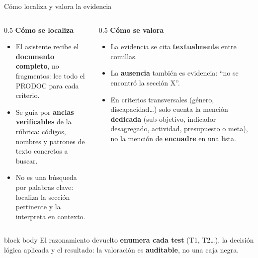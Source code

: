 \documentclass[aspectratio=169,11pt]{beamer}
\newcommand{\redlead}[1]{\textbf{\color{iloRed}#1}}
\newcommand{\bluelead}[1]{\textbf{\color{iloBlue}#1}}
\begin{document}
\begin{frame}{Cómo localiza y valora la evidencia}
  \small
  \begin{columns}[T]
    \begin{column}{0.5\textwidth}
      \bluelead{Cómo se localiza}
      \begin{itemize}
        \item El asistente recibe el \textbf{documento completo}, no fragmentos: lee todo el PRODOC para cada criterio.
        \item Se guía por \bluelead{anclas verificables} de la rúbrica: códigos, nombres y patrones de texto concretos a buscar.
        \item No es una búsqueda por palabras clave: localiza la sección pertinente y la interpreta en contexto.
      \end{itemize}
    \end{column}
    \begin{column}{0.5\textwidth}
      \bluelead{Cómo se valora}
      \begin{itemize}
        \item La evidencia se cita \redlead{textualmente} entre comillas.
        \item La \textbf{ausencia} también es evidencia: ``no se encontró la sección X''.
        \item En criterios transversales (género, discapacidad\dots) solo cuenta la mención \bluelead{dedicada} (sub-objetivo, indicador desagregado, actividad, presupuesto o meta), no la mención de \textbf{encuadre} en una lista.
      \end{itemize}
    \end{column}
  \end{columns}
  \vspace{0.15cm}
  \begin{beamercolorbox}[wd=\textwidth,sep=5pt]{block body}
    \centering\footnotesize El razonamiento devuelto \bluelead{enumera cada test} (T1, T2\dots), la decisión lógica aplicada y el resultado: la valoración es \textbf{auditable}, no una caja negra.
  \end{beamercolorbox}
\end{frame}
\end{document}
